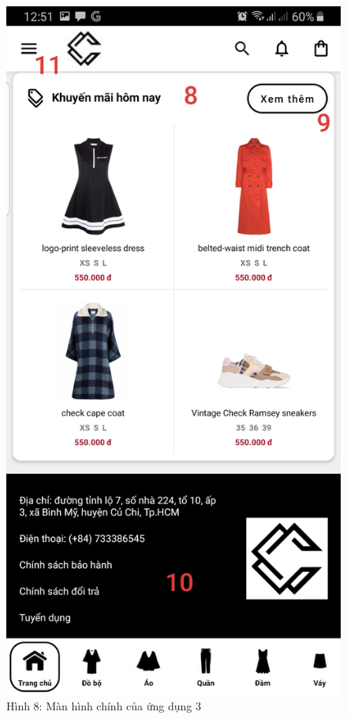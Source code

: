 \documentclass{beamer}
\begin{document}
\begin{frame}
    \begin{columns}
        \begin{figure}
            \centering
            \includegraphics[height=0.7\textheight]{images/08.png}
            \caption{\centering\tiny{Hình 8: Màn hình chính của ứng dụng 3}}


\end{figure}
\end{columns}
\end{frame}
\end{document}
